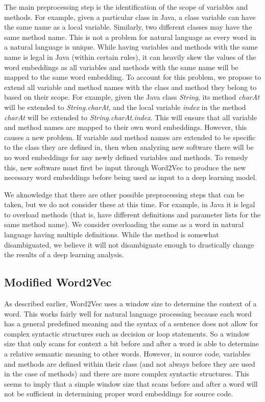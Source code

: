 The main preprocessing step is the identification of the scope of variables and methods. For example, given a particular class in Java, a class variable can have the same name as a local variable. Similarly, two different classes may have the same method name. This is not a problem for natural language as every word in a natural language is unique. While having variables and methods with the same name is legal in Java (within certain rules), it can heavily skew the values of the word embeddings as all variables and methods with the same name will be mapped to the same word embedding. To account for this problem, we propose to extend all variable and method names with the class and method they belong to based on their scope. For example, given the Java class \textit{String}, its method \textit{charAt} will be extended to \textit{String.charAt}, and the local variable \textit{index} in the method \textit{charAt} will be extended to \textit{String.charAt.index}. This will ensure that all variable and method names are mapped to their own word embeddings. However, this causes a new problem. If variable and method names are extended to be specific to the class they are defined in, then when analyzing new software there will be no word embeddings for any newly defined variables and methods. To remedy this, new software must first be input through Word2Vec to produce the new necessary word embeddings before being used as input to a deep learning model.

We aknowledge that there are other possible preprocessing steps that can be taken, but we do not consider these at this time. For example, in Java it is legal to overload methods (that is, have different definitions and parameter lists for the same method name). We consider overloading the same as a word in natural language having multiple definitions. While the method is somewhat disambiguated, we believe it will not disambiguate enough to drastically change the results of a deep learning analysis.

\subsection{Modified Word2Vec}

As described earlier, Word2Vec uses a window size to determine the context of a word. This works fairly well for natural language processing because each word has a general predefined meaning and the syntax of a sentence does not allow for complex syntactic structures such as decision or loop statements. So a window size that only scans for context a bit before and after a word is able to determine a relative semantic meaning to other words. However, in source code, variables and methods are defined within their class (and not always before they are used in the case of methods) and there are more complex syntactic structures. This seems to imply that a simple window size that scans before and after a word will not be sufficient in determining proper word embeddings for source code.

